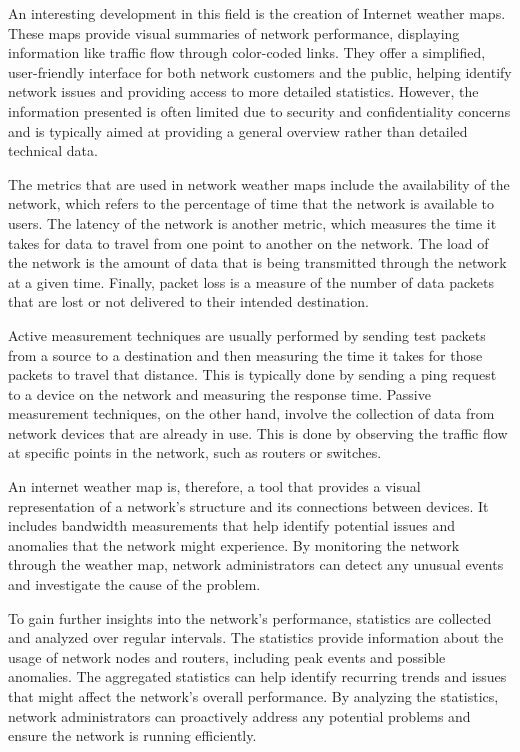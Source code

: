 \documentclass[sigconf,authorversion,nonacm]{acmart}
\begin{document}
An interesting development in this field is the creation of Internet weather maps. These maps provide visual summaries of network performance, displaying information like traffic flow through color-coded links. They offer a simplified, user-friendly interface for both network customers and the public, helping identify network issues and providing access to more detailed statistics. However, the information presented is often limited due to security and confidentiality concerns and is typically aimed at providing a general overview rather than detailed technical data. 

The metrics that are used in network weather maps include the availability of the network, which refers to the percentage of time that the network is available to users. The latency of the network is another metric, which measures the time it takes for data to travel from one point to another on the network. The load of the network is the amount of data that is being transmitted through the network at a given time. Finally, packet loss is a measure of the number of data packets that are lost or not delivered to their intended destination.

Active measurement techniques are usually performed by sending test packets from a source to a destination and then measuring the time it takes for those packets to travel that distance. This is typically done by sending a ping request to a device on the network and measuring the response time. Passive measurement techniques, on the other hand, involve the collection of data from network devices that are already in use. This is done by observing the traffic flow at specific points in the network, such as routers or switches.

An internet weather map is, therefore, a tool that provides a visual representation of a network's structure and its connections between devices. It includes bandwidth measurements that help identify potential issues and anomalies that the network might experience. By monitoring the network through the weather map, network administrators can detect any unusual events and investigate the cause of the problem. 

To gain further insights into the network's performance, statistics are collected and analyzed over regular intervals. The statistics provide information about the usage of network nodes and routers, including peak events and possible anomalies. The aggregated statistics can help identify recurring trends and issues that might affect the network's overall performance. By analyzing the statistics, network administrators can proactively address any potential problems and ensure the network is running efficiently.
\end{document}
